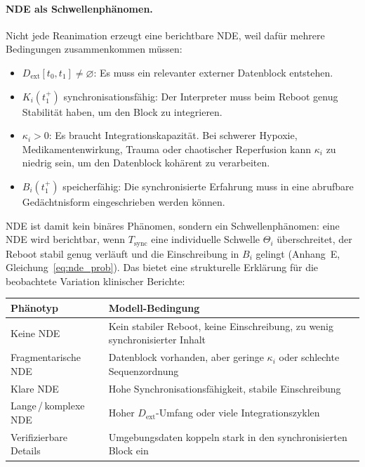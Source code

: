 \documentclass[11pt,a4paper]{article}
\begin{document}
\paragraph{NDE als Schwellenphänomen.}
Nicht jede Reanimation erzeugt eine berichtbare NDE, weil dafür mehrere
Bedingungen zusammenkommen müssen:

\begin{itemize}
  \item $D_{\mathrm{ext}}[t_0,t_1] \neq \varnothing$: Es muss ein relevanter
    externer Datenblock entstehen.
  \item $K_i(t_1^+)$ synchronisationsfähig: Der Interpreter muss beim Reboot
    genug Stabilität haben, um den Block zu integrieren.
  \item $\kappa_i > 0$: Es braucht Integrationskapazität. Bei schwerer
    Hypoxie, Medikamentenwirkung, Trauma oder chaotischer Reperfusion kann
    $\kappa_i$ zu niedrig sein, um den Datenblock kohärent zu verarbeiten.
  \item $B_i(t_1^+)$ speicherfähig: Die synchronisierte Erfahrung muss in
    eine abrufbare Gedächtnisform eingeschrieben werden können.
\end{itemize}

NDE ist damit kein binäres Phänomen, sondern ein Schwellenphänomen: eine NDE
wird berichtbar, wenn $T_{\mathrm{sync}}$ eine individuelle Schwelle $\Theta_i$
überschreitet, der Reboot stabil genug verläuft und die Einschreibung in $B_i$
gelingt (Anhang~E, Gleichung~\eqref{eq:nde_prob}). Das bietet eine strukturelle Erklärung für die beobachtete
Variation klinischer Berichte:

\medskip
\begin{center}\small
\begin{tabular}{@{}p{}p{}@{}}
\toprule
Phänotyp & Modell-Bedingung \\
\midrule
Keine NDE &
  Kein stabiler Reboot, keine Einschreibung, zu wenig synchronisierter Inhalt \\
Fragmentarische NDE &
  Datenblock vorhanden, aber geringe $\kappa_i$ oder schlechte Sequenzordnung \\
Klare NDE &
  Hohe Synchronisationsfähigkeit, stabile Einschreibung \\
Lange\,/\,komplexe NDE &
  Hoher $D_{\mathrm{ext}}$-Umfang oder viele Integrationszyklen \\
Verifizierbare Details &
  Umgebungsdaten koppeln stark in den synchronisierten Block ein \\
\bottomrule
\end{tabular}
\end{center}
\medskip
\end{document}
